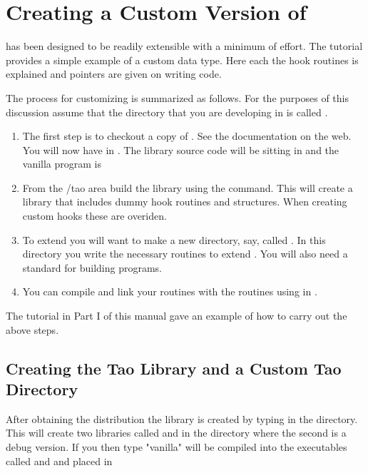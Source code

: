\chapter{Creating a Custom Version of \tao}
\label{c:prog_customizing} 

\tao has been designed to be readily extensible with a minimum of
effort. The tutorial provides a simple example of a custom data type. Here each
the hook routines is explained and pointers are given on writing code. 

The process for customizing is summarized as follows. For the purposes of this
discussion assume that the directory that you are developing \tao in
is called . 
\begin{enumerate}
\item 
The first step is to checkout a
copy of \tao. See the \tao documentation on the web. You will now have \tao in
. The library source code will be sitting in 
and the vanilla \tao program is 
\item 
From the /tao area build the \tao library using the
 command. This will create a \tao library that includes dummy hook
routines and structures. When creating custom hooks these are overiden.
\item
To extend \tao you will want to make a new
directory, say, called . In this directory you write
the necessary routines to extend \tao. You will also need a standard 
 for building programs.
\item
You can compile and link your routines with the \tao routines using
 in .
\end{enumerate}

The tutorial in Part I of this manual gave an example of how to carry out the
above steps.

\section{Creating the Tao Library and a Custom Tao Directory}

After obtaining the \tao distribution the \tao library is created by typing
 in the  directory. This will create two libraries
called  and  in the directory  where
the second is a debug version. If you then type  "vanilla"
\tao will be compiled into the executables called  and  and
placed in 

